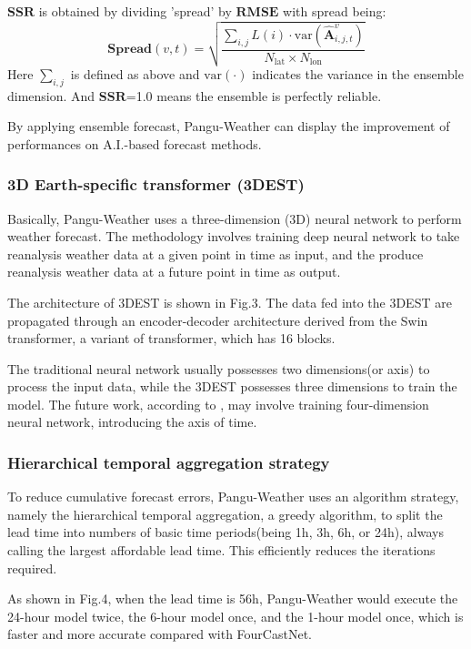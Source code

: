 \documentclass[conference]{IEEEtran}
\begin{document}
$\mathbf{SSR}$ is obtained by dividing 'spread' by $\mathbf{RMSE}$ with spread being:
    \begin{equation}
        \nonumber
        \mathbf{Spread}(v, t)=\sqrt{\frac{\sum_{i,j}L(i)\cdot  \mathrm{var}(\hat{\mathbf{A}}_{i,j,t}^v)}{N_{\mathrm{lat}}\times N_{\mathrm{lon}}}}
    \end{equation}
Here $\sum_{i, j}$ is defined as above and $\mathrm{var}(\cdot)$ indicates the variance in the ensemble dimension. And $\mathbf{SSR}$=1.0 means the ensemble is perfectly reliable. 

By applying ensemble forecast, Pangu-Weather can display the improvement of performances on A.I.-based forecast methods.
\subsubsection{3D Earth-specific transformer (3DEST)}

Basically, Pangu-Weather uses a three-dimension (3D) neural network to perform weather forecast. The methodology involves training deep neural network to take reanalysis weather data at a given point in time as input, and the produce reanalysis weather data at a future point in time as output.

The architecture of 3DEST is shown in Fig.3. The data fed into the 3DEST are propagated through an encoder-decoder architecture derived from the Swin transformer, a variant of transformer, which has 16 blocks.

The traditional neural network usually possesses two dimensions(or axis) to process the input data, while the 3DEST possesses three dimensions to train the model. The future work, according to \cite{b15}, may involve training four-dimension neural network, introducing the axis of time.

\subsubsection{Hierarchical temporal aggregation strategy}
To reduce cumulative forecast errors, Pangu-Weather uses an algorithm strategy, namely the hierarchical temporal aggregation, a greedy algorithm, to split the lead time into numbers of basic time periods(being 1h, 3h, 6h, or 24h), always calling the largest affordable lead time. This efficiently reduces the iterations required.

As shown in Fig.4, when the lead time is 56h, Pangu-Weather would execute the 24-hour model twice, the 6-hour model once, and the 1-hour model once, which is faster and more accurate compared with FourCastNet\cite{b18}.
\end{document}
